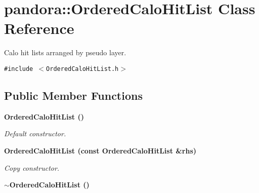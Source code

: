 \section{pandora::Ordered\-Calo\-Hit\-List Class Reference}
\label{classpandora_1_1OrderedCaloHitList}
Calo hit lists arranged by pseudo layer.  


{\tt \#include $<$Ordered\-Calo\-Hit\-List.h$>$}

\subsection*{Public Member Functions}
\begin{CompactItemize}
\item 
\bf{Ordered\-Calo\-Hit\-List} ()\label{classpandora_1_1OrderedCaloHitList_382e53e42fa82fff3a9d46c0d4434860}

\begin{CompactList}\small\item\em Default constructor. \item\end{CompactList}\item 
\bf{Ordered\-Calo\-Hit\-List} (const \bf{Ordered\-Calo\-Hit\-List} \&rhs)
\begin{CompactList}\small\item\em Copy constructor. \item\end{CompactList}\item 
\bf{$\sim$Ordered\-Calo\-Hit\-List} ()\label{classpandora_1_1OrderedCaloHitList_3ead500fa7e2d5166ae5de503ee43916}


\end{CompactItemize}
